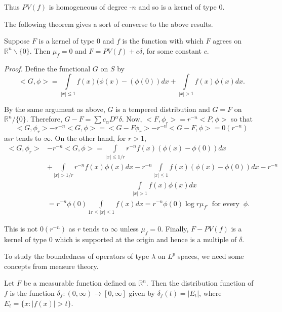 Thus $PV (f)$ is homogeneous of degree -$n$ and so is a kernel of type 0.

The following theorem gives a sort of converse to the above results.

\setcounter{thm}{4}
\begin{thm}\label{chap5:thm5.5}%
  Suppose $F$ is a kernel of type $0$ and $f$ is
    the function with which $F$ agrees on $\mathbb{R}^n \backslash  \{
  0\}$. Then $\mu_f = 0$ and  $F = PV(f) + c \delta$, 
    for some constant $c$. 
\end{thm}

\noindent\textit{Proof.}
Define the functional $G$ on $S$ by
\begin{equation*}
  < G, \phi > = \int\limits_{|x| \le 1} f(x) (\phi (x)-(\phi (0)) dx +
  \int\limits_{|x| > 1} f(x) \phi (x) dx. \tag*{$\Box$}
\end{equation*}

By the same argument as above, $G$ is a tempered distribution and $G =
F$ on $\mathbb{R}^n / \{ 0\}$. Therefore, $G -  F = \sum c_{\alpha}
D^{\alpha} \delta$. Now, $< F, \phi_r > = r^{-n} < P, \phi >$ so that  
$$
< G, \phi_r > - r^{-n} <G, \phi > = < G-F \phi_r > - r^{-n} < G - F,
\phi > = 0 (r^{-n}) 
$$
as\pageoriginale $r$ tends to $\infty$. On the other hand, for $r > 1$,
\begin{align*}
  < G, \phi_r > &- r^{-n} < G, \phi > = \int\limits_{|x| \le 1/r} r^{-n}
  f(x) (\phi (x) - \phi (0)) dx \\
  & + \int\limits_{|x| > 1/r} r^{-n} f(x)
  \phi (x) dx - r^{-n} \int\limits_{|x| \le 1} f(x) (\phi (x) - \phi
  (0)) dx-r^{-n} \\
  & \hspace{5cm}\int\limits_{|x| > 1} f(x) \phi (x) dx\\ 
  & = r^{-n} \phi (0) \int\limits_{1r \le |x| \le 1} f(x) dx = r^{-n}\phi
  (0) \log r \mu_{f'} ~\text { for every }~ \phi. 
\end{align*}


This is not $0 (r^{-n})$ as $r$ tends to $\infty$ unless $\mu_f =
0$. Finally, $F- PV (f)$ is a kernel of type $0$ which is supported at
the origin and hence is a multiple of $\delta$. 

To study the boundedness of operators of type $\lambda$ on $L^p$
spaces, we need some concepts from measure theory. 

\setcounter{defi}{5}
\begin{defi}\label{chap5:def5.6}%
  Let $F$ be a measurable function defined on
  $\mathbb{R}^n$. Then the distribution function of $f$ is
  the function  $\delta_f : (0, \infty) \to [0, \infty]$ given
  by $\delta_f(t) = |E_t|$, where  $E_t = \{ x: |f (x) | >
  t\}$. 
\end{defi}

